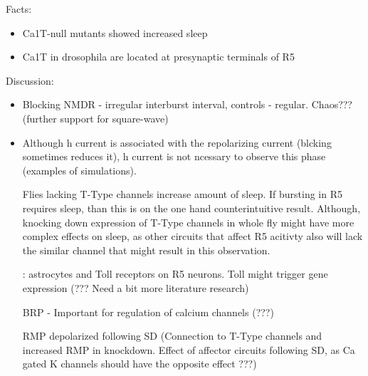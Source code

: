 \documentclass[../main.tex]{subfiles}
\begin{document}
\color{black}


\noindent\hrulefill

\color{orange}

Facts:
\begin{itemize}
    \item Ca1T-null mutants showed increased sleep \cite{jeongCaa1TFlyTtype2015}
    \item Ca1T in drosophila are located at presynaptic terminals of R5
    
\end{itemize}

\color{red}

Discussion:
\begin{itemize}
    \item Blocking NMDR - irregular interburst interval, controls - regular.
    Chaos??? (further support for square-wave)
    \cite{raccugliaNetworkSpecificSynchronizationElectrical2019,izhikevichNEURALEXCITABILITYSPIKING2000}
    
    \item Although h current is associated with the repolarizing current (blcking sometimes reduces it),
    h current is not ncessary to observe this phase (examples of simulations).

    \cite{jeongCaa1TFlyTtype2015} Flies lacking T-Type channels increase amount of sleep. If bursting in
    R5 requires sleep, than this is on the one hand counterintuitive result. Although, knocking down
    expression of T-Type channels in whole fly might have more complex effects on sleep, as other
    circuits that affect R5 acitivty also will lack the similar channel that might result in this
    observation.

    \cite{blumAstroglialCalciumSignaling2021}: astrocytes and Toll receptors on R5 neurons.
    Toll might trigger gene expression (??? Need a bit more literature research)

    BRP - Important for regulation of calcium channels (???)

    RMP depolarized following SD (Connection to T-Type channels and increased RMP in knockdown.
    Effect of affector circuits following SD, as Ca gated K channels should have the opposite effect ???)
    \cite{liuSleepDriveEncoded2016}


\end{itemize}
\end{document}
